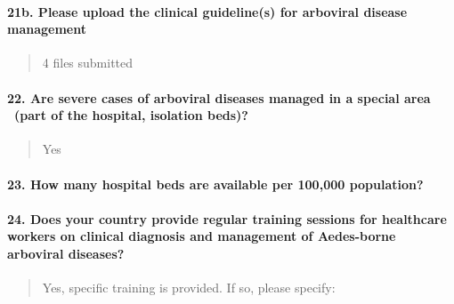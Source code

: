 \documentclass[
]{article}
\begin{document}
\hypertarget{b.-please-upload-the-clinical-guidelines-for-arboviral-disease-management}{%
\paragraph{21b. Please upload the clinical guideline(s) for arboviral
disease
management}\label{b.-please-upload-the-clinical-guidelines-for-arboviral-disease-management}}

\begin{quote}
4 files submitted
\end{quote}

\hypertarget{are-severe-cases-of-arboviral-diseases-managed-in-a-special-area-part-of-the-hospital-isolation-beds}{%
\paragraph{22. Are severe cases of arboviral diseases managed in a
special area ~(part of the hospital, isolation
beds)?}\label{are-severe-cases-of-arboviral-diseases-managed-in-a-special-area-part-of-the-hospital-isolation-beds}}

\begin{quote}
Yes
\end{quote}

\hypertarget{how-many-hospital-beds-are-available-per-100000-population}{%
\paragraph{23. How many hospital beds are available per 100,000
population?}\label{how-many-hospital-beds-are-available-per-100000-population}}

\begin{quote}
\end{quote}

\hypertarget{does-your-country-provide-regular-training-sessions-for-healthcare-workers-on-clinical-diagnosis-and-management-of-aedes-borne-arboviral-diseases}{%
\paragraph{24. Does your country provide regular training sessions for
healthcare workers on clinical diagnosis and management of Aedes-borne
arboviral
diseases?}\label{does-your-country-provide-regular-training-sessions-for-healthcare-workers-on-clinical-diagnosis-and-management-of-aedes-borne-arboviral-diseases}}

\begin{quote}
Yes, specific training is provided. If so, please specify:
\end{quote}
\end{document}

